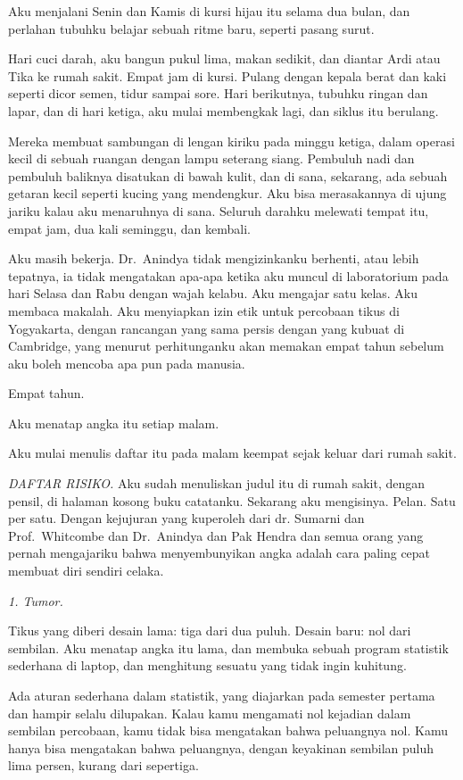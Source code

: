 \documentclass[11pt,twoside,openany]{book}
\makeatletter
\newcommand{\scenebreak}{\par\vspace{0.9em}{\centering\textsc{*\hspace{0.7em}*\hspace{0.7em}*}\par}\vspace{0.9em}\@afterindentfalse\@afterheading}
\makeatother
\begin{document}
\scenebreak
Aku menjalani Senin dan Kamis di kursi hijau itu selama dua bulan, dan perlahan tubuhku belajar sebuah ritme baru, seperti pasang surut.

Hari cuci darah, aku bangun pukul lima, makan sedikit, dan diantar Ardi atau Tika ke rumah sakit. Empat jam di kursi. Pulang dengan kepala berat dan kaki seperti dicor semen, tidur sampai sore. Hari berikutnya, tubuhku ringan dan lapar, dan di hari ketiga, aku mulai membengkak lagi, dan siklus itu berulang.

Mereka membuat sambungan di lengan kiriku pada minggu ketiga, dalam operasi kecil di sebuah ruangan dengan lampu seterang siang. Pembuluh nadi dan pembuluh baliknya disatukan di bawah kulit, dan di sana, sekarang, ada sebuah getaran kecil seperti kucing yang mendengkur. Aku bisa merasakannya di ujung jariku kalau aku menaruhnya di sana. Seluruh darahku melewati tempat itu, empat jam, dua kali seminggu, dan kembali.

Aku masih bekerja. Dr.~Anindya tidak mengizinkanku berhenti, atau lebih tepatnya, ia tidak mengatakan apa-apa ketika aku muncul di laboratorium pada hari Selasa dan Rabu dengan wajah kelabu. Aku mengajar satu kelas. Aku membaca makalah. Aku menyiapkan izin etik untuk percobaan tikus di Yogyakarta, dengan rancangan yang sama persis dengan yang kubuat di Cambridge, yang menurut perhitunganku akan memakan empat tahun sebelum aku boleh mencoba apa pun pada manusia.

Empat tahun.

Aku menatap angka itu setiap malam.

\scenebreak
Aku mulai menulis daftar itu pada malam keempat sejak keluar dari rumah sakit.

\emph{DAFTAR RISIKO.} Aku sudah menuliskan judul itu di rumah sakit, dengan pensil, di halaman kosong buku catatanku. Sekarang aku mengisinya. Pelan. Satu per satu. Dengan kejujuran yang kuperoleh dari dr. Sumarni dan Prof.~Whitcombe dan Dr.~Anindya dan Pak Hendra dan semua orang yang pernah mengajariku bahwa menyembunyikan angka adalah cara paling cepat membuat diri sendiri celaka.

\emph{1. Tumor.}

Tikus yang diberi desain lama: tiga dari dua puluh. Desain baru: nol dari sembilan. Aku menatap angka itu lama, dan membuka sebuah program statistik sederhana di laptop, dan menghitung sesuatu yang tidak ingin kuhitung.

Ada aturan sederhana dalam statistik, yang diajarkan pada semester pertama dan hampir selalu dilupakan. Kalau kamu mengamati nol kejadian dalam sembilan percobaan, kamu tidak bisa mengatakan bahwa peluangnya nol. Kamu hanya bisa mengatakan bahwa peluangnya, dengan keyakinan sembilan puluh lima persen, kurang dari sepertiga.
\end{document}
